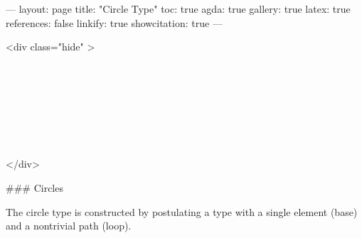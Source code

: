 ---
layout: page
title: "Circle Type"
toc: true
agda: true
gallery: true
latex: true
references: false
linkify: true
showcitation: true
---

<div class="hide" >
\begin{code}%
\>[0]\AgdaSymbol{\{-\#}\AgdaSpace{}%
\AgdaSpace{}%
\AgdaSpace{}%
\AgdaSymbol{\#-\}}\<%
\\
\>[0]\AgdaSpace{}%
\AgdaSpace{}%
\<%
\\
\>[0]\AgdaSpace{}%
\AgdaSpace{}%
\<%
\\
%
\\[\AgdaEmptyExtraSkip]%
\>[0]\AgdaSpace{}%
\AgdaSpace{}%
\<%
\\
\>[0]\AgdaSpace{}%
\AgdaSpace{}%
\<%
\\
\>[0]\AgdaSpace{}%
\AgdaSpace{}%
\<%
\end{code}
</div>

### Circles

The circle type is constructed by postulating a type with
a single element (base) and a nontrivial path (loop).

